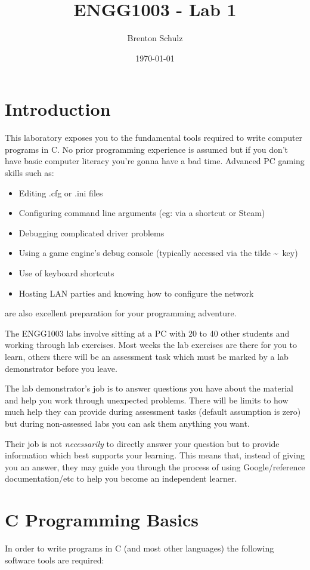 \documentclass{lab}
\title{ENGG1003 - Lab 1}
\author{Brenton Schulz}
\date{\today}
\begin{document}
\maketitle

\section{Introduction}
This laboratory exposes you to the fundamental tools required to write computer programs in C. No prior programming experience is assumed but if you don't have basic computer literacy you're gonna have a bad time. Advanced PC gaming skills such as:

\begin{itemize}
\item Editing .cfg or .ini files
\item Configuring command line arguments (eg: via a shortcut or Steam)
\item Debugging complicated driver problems
\item Using a game engine's debug console (typically accessed via the tilde \textasciitilde\ key)
\item Use of keyboard shortcuts
\item Hosting LAN parties and knowing how to configure the network
\end{itemize}

are also excellent preparation for your programming adventure.

The ENGG1003 labs involve sitting at a PC with 20 to 40 other students and working through lab exercises. Most weeks the lab exercises are there for you to learn, others there will be an assessment task which must be marked by a lab demonstrator before you leave.

The lab demonstrator's job is to answer questions you have about the material and help you work through unexpected problems. There will be limits to how much help they can provide during assessment tasks (default assumption is zero) but during non-assessed labs you can ask them anything you want.

Their job is not \textit{necessarily} to directly answer your question but to provide information which best supports your learning. This means that, instead of giving you an answer, they may guide you through the process of using Google/reference documentation/etc to help you become an independent learner.

\tableofcontents

\pagebreak
\section{C Programming Basics}
In order to write programs in C (and most other languages) the following software tools are required:
\end{document}
